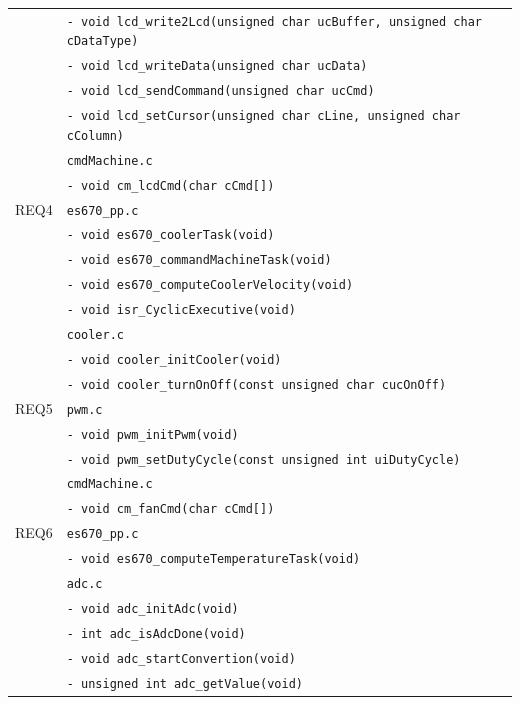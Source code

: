 \documentclass{article}
\begin{document}
\begin{table}[H]
\begin{tabular}{|c|l|}
						& \texttt{- void lcd\_write2Lcd(unsigned char ucBuffer,  unsigned char cDataType)}\\
						& \texttt{- void lcd\_writeData(unsigned char ucData)}\\
						& \texttt{- void lcd\_sendCommand(unsigned char ucCmd)}\\
						& \texttt{- void lcd\_setCursor(unsigned char cLine, unsigned char cColumn)}\\
					& \texttt{cmdMachine.c}\\ 
						& \texttt{- void cm\_lcdCmd(char cCmd[])}\\
   	     	\hline REQ4    	& \texttt{es670\_pp.c}\\
           		           		& \texttt{- void es670\_coolerTask(void)}\\
                     		   			& \texttt{- void es670\_commandMachineTask(void)}\\
						& \texttt{- void es670\_computeCoolerVelocity(void)}\\
						& \texttt{- void isr\_CyclicExecutive(void)}\\
					& \texttt{cooler.c}\\
						& \texttt{- void cooler\_initCooler(void)}\\
						& \texttt{- void cooler\_turnOnOff(const unsigned char cucOnOff)}\\
       		\hline REQ5     	& \texttt{pwm.c}\\
						& \texttt{- void pwm\_initPwm(void)}\\
						& \texttt{- void pwm\_setDutyCycle(const unsigned int uiDutyCycle)}\\
					& \texttt{cmdMachine.c}\\
						& \texttt{- void cm\_fanCmd(char cCmd[])}\\
       		\hline REQ6    	& \texttt{es670\_pp.c}\\
						& \texttt{- void es670\_computeTemperatureTask(void)}\\
					& \texttt{adc.c}\\
						& \texttt{- void adc\_initAdc(void)}\\
						& \texttt{- int adc\_isAdcDone(void)}\\
						& \texttt{- void adc\_startConvertion(void)}\\
						& \texttt{- unsigned int adc\_getValue(void)}\\
		\hline 
	\end{tabular} 
	\normalsize
\end{table}
\end{document}
